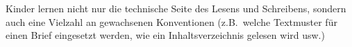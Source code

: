Kinder lernen nicht nur die technische Seite des Lesens und Schreibens, sondern auch eine Vielzahl an gewachsenen Konventionen (z.B.\ welche Textmuster für einen Brief eingesetzt werden, wie ein Inhaltsverzeichnis gelesen wird usw.)
